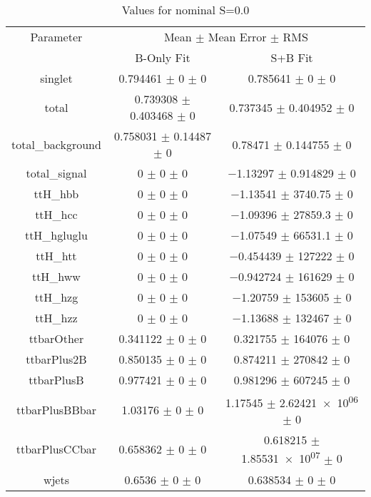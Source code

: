\begin{table}
\centering
\caption{Values for nominal S=0.0}
\begin{tabular}{ccc}
\toprule
Parameter & \multicolumn{2}{c}{Mean $\pm$ Mean Error $\pm$ RMS}\\
 & B-Only Fit & S+B Fit\\
\midrule
singlet & \num{0.794461} $\pm$ \num{0} $\pm$ \num{0} & \num{0.785641} $\pm$ \num{0} $\pm$ \num{0}\\
total & \num{0.739308} $\pm$ \num{0.403468} $\pm$ \num{0} & \num{0.737345} $\pm$ \num{0.404952} $\pm$ \num{0}\\
total\_background & \num{0.758031} $\pm$ \num{0.14487} $\pm$ \num{0} & \num{0.78471} $\pm$ \num{0.144755} $\pm$ \num{0}\\
total\_signal & \num{0} $\pm$ \num{0} $\pm$ \num{0} & \num{-1.13297} $\pm$ \num{0.914829} $\pm$ \num{0}\\
ttH\_hbb & \num{0} $\pm$ \num{0} $\pm$ \num{0} & \num{-1.13541} $\pm$ \num{3740.75} $\pm$ \num{0}\\
ttH\_hcc & \num{0} $\pm$ \num{0} $\pm$ \num{0} & \num{-1.09396} $\pm$ \num{27859.3} $\pm$ \num{0}\\
ttH\_hgluglu & \num{0} $\pm$ \num{0} $\pm$ \num{0} & \num{-1.07549} $\pm$ \num{66531.1} $\pm$ \num{0}\\
ttH\_htt & \num{0} $\pm$ \num{0} $\pm$ \num{0} & \num{-0.454439} $\pm$ \num{127222} $\pm$ \num{0}\\
ttH\_hww & \num{0} $\pm$ \num{0} $\pm$ \num{0} & \num{-0.942724} $\pm$ \num{161629} $\pm$ \num{0}\\
ttH\_hzg & \num{0} $\pm$ \num{0} $\pm$ \num{0} & \num{-1.20759} $\pm$ \num{153605} $\pm$ \num{0}\\
ttH\_hzz & \num{0} $\pm$ \num{0} $\pm$ \num{0} & \num{-1.13688} $\pm$ \num{132467} $\pm$ \num{0}\\
ttbarOther & \num{0.341122} $\pm$ \num{0} $\pm$ \num{0} & \num{0.321755} $\pm$ \num{164076} $\pm$ \num{0}\\
ttbarPlus2B & \num{0.850135} $\pm$ \num{0} $\pm$ \num{0} & \num{0.874211} $\pm$ \num{270842} $\pm$ \num{0}\\
ttbarPlusB & \num{0.977421} $\pm$ \num{0} $\pm$ \num{0} & \num{0.981296} $\pm$ \num{607245} $\pm$ \num{0}\\
ttbarPlusBBbar & \num{1.03176} $\pm$ \num{0} $\pm$ \num{0} & \num{1.17545} $\pm$ \num{2.62421e+06} $\pm$ \num{0}\\
ttbarPlusCCbar & \num{0.658362} $\pm$ \num{0} $\pm$ \num{0} & \num{0.618215} $\pm$ \num{1.85531e+07} $\pm$ \num{0}\\
wjets & \num{0.6536} $\pm$ \num{0} $\pm$ \num{0} & \num{0.638534} $\pm$ \num{0} $\pm$ \num{0}\\
\bottomrule
\end{tabular}
\end{table}